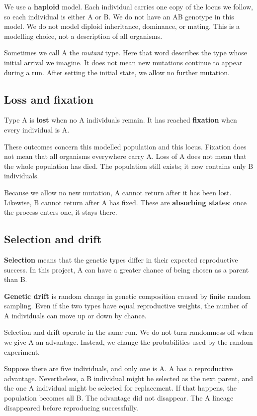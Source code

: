 We use a \textbf{haploid} model. Each individual carries one copy of the locus
we follow, so each individual is either A or B. We do not have an AB genotype
in this model. We do not model diploid inheritance, dominance, or mating.
This is a modelling choice, not a description of all organisms.

Sometimes we call A the \emph{mutant} type. Here that word describes the type
whose initial arrival we imagine. It does not mean new mutations continue to
appear during a run. After setting the initial state, we allow no further
mutation.

\subsection{Loss and fixation}

Type A is \textbf{lost} when no A individuals remain. It has reached
\textbf{fixation} when every individual is A.

These outcomes concern this modelled population and this locus. Fixation
does not mean that all organisms everywhere carry A. Loss of A does not mean
that the whole population has died. The population still exists; it now
contains only B individuals.

Because we allow no new mutation, A cannot return after it has been lost.
Likewise, B cannot return after A has fixed. These are \textbf{absorbing
states}: once the process enters one, it stays there.

\subsection{Selection and drift}

\textbf{Selection} means that the genetic types differ in their expected
reproductive success. In this project, A can have a greater chance of being
chosen as a parent than B.

\textbf{Genetic drift} is random change in genetic composition caused by
finite random sampling. Even if the two types have equal reproductive
weights, the number of A individuals can move up or down by chance.

Selection and drift operate in the same run. We do not turn randomness off
when we give A an advantage. Instead, we change the probabilities used by
the random experiment.

\begin{workedexample}
Suppose there are five individuals, and only one is A. A has a reproductive
advantage. Nevertheless, a B individual might be selected as the next parent,
and the one A individual might be selected for replacement. If that happens,
the population becomes all B. The advantage did not disappear. The A lineage
disappeared before reproducing successfully.
\end{workedexample}

